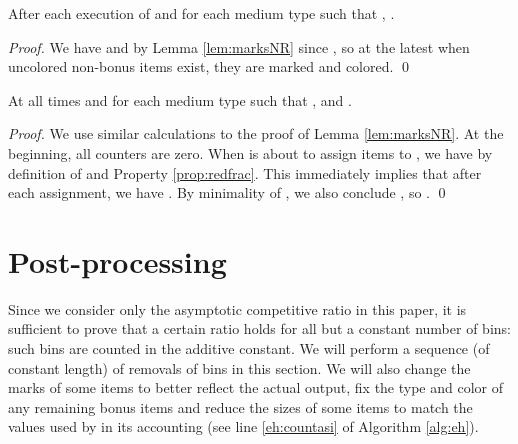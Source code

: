 \begin{corollary}
	\label{cor:uncolored}
	After each execution of \MarkItems{} and for each medium type   such that , .
\end{corollary}
\begin{proof}
	We have  and  by Lemma \ref{lem:marksNR}  since , so at the latest when
	 uncolored non-bonus items exist, they are marked and colored.
\qed\end{proof}




\begin{lemma}
\label{lem:markB}
At all times and for each medium type  such that , 
and . 
\end{lemma}
\begin{proof}
We use similar calculations to the proof of Lemma \ref{lem:marksNR}.
At the beginning, all counters are zero. When {\MarkItems} is about to assign items to , 
we have 
by definition of  and Property \ref{prop:redfrac}.
This immediately implies that after each assignment,
we have . 
By minimality of , we also conclude , so  .
\qed\end{proof}





















\section{Post-processing}
\label{sec:post}
Since we consider only the asymptotic competitive ratio in this paper, 
it is sufficient to prove that a certain ratio holds for 
all but a constant number of bins: such bins are counted in the additive constant.
We will perform a sequence (of constant length) of removals of bins in this section.
We will also change the marks of some items to better reflect the actual output, 
fix the type and color of any remaining bonus items and reduce the sizes of some items
to match the values used by {\EHarm} in its accounting (see line \ref{eh:countasi} of Algorithm \ref{alg:eh}).






